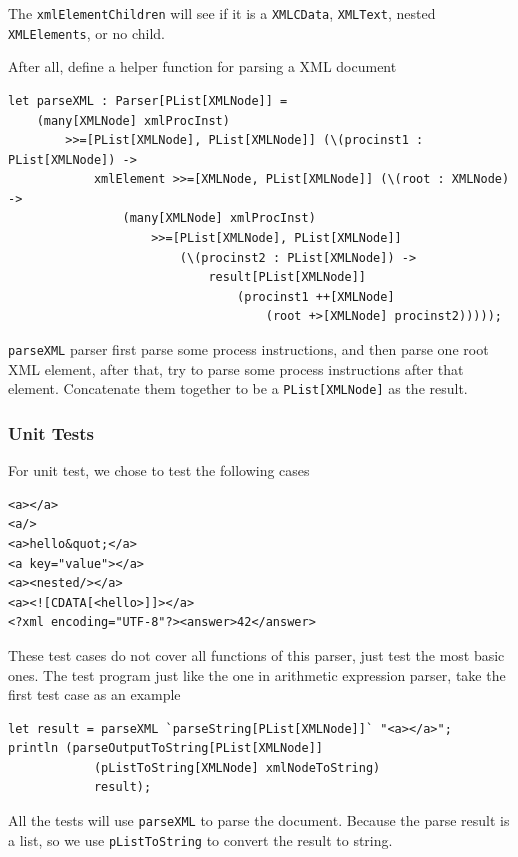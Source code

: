 The \texttt{xmlElementChildren} will see if it is a \texttt{XMLCData}, \texttt{XMLText}, nested \texttt{XMLElements}, or no child.

After all, define a helper function for parsing a XML document

\begin{lstlisting}
let parseXML : Parser[PList[XMLNode]] =
    (many[XMLNode] xmlProcInst)
        >>=[PList[XMLNode], PList[XMLNode]] (\(procinst1 : PList[XMLNode]) ->
            xmlElement >>=[XMLNode, PList[XMLNode]] (\(root : XMLNode) ->
                (many[XMLNode] xmlProcInst)
                    >>=[PList[XMLNode], PList[XMLNode]]
                        (\(procinst2 : PList[XMLNode]) ->
                            result[PList[XMLNode]]
                                (procinst1 ++[XMLNode]
                                    (root +>[XMLNode] procinst2)))));
\end{lstlisting}

\texttt{parseXML} parser first parse some process instructions, and then parse one root XML element, after that, try to parse some process instructions after that element. Concatenate them together to be a \texttt{PList[XMLNode]} as the result.

\subsubsection{Unit Tests}

For unit test, we chose to test the following cases

\begin{lstlisting}[language={}]
<a></a>
<a/>
<a>hello&quot;</a>
<a key="value"></a>
<a><nested/></a>
<a><![CDATA[<hello>]]></a>
<?xml encoding="UTF-8"?><answer>42</answer>
\end{lstlisting}

These test cases do not cover all functions of this parser, just test the most basic ones. The test program just like the one in arithmetic expression parser, take the first test case as an example

\begin{lstlisting}
let result = parseXML `parseString[PList[XMLNode]]` "<a></a>";
println (parseOutputToString[PList[XMLNode]]
            (pListToString[XMLNode] xmlNodeToString)
            result);
\end{lstlisting}

All the tests will use \texttt{parseXML} to parse the document. Because the parse result is a list, so we use \texttt{pListToString} to convert the result to string.

